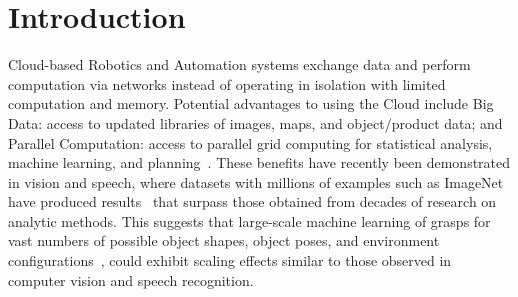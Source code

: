 \section{Introduction}

Cloud-based Robotics and Automation systems exchange data and perform computation via networks instead of operating in isolation with limited computation and memory.
Potential advantages to using the Cloud include Big Data: access to updated libraries of images, maps, and object/product data; and Parallel Computation: access to parallel grid computing for statistical analysis, machine learning, and planning~\cite{kehoe2015survey}.
These benefits have recently been demonstrated in vision and speech, where datasets with millions of examples such as ImageNet have produced results~\cite{hannun2014deepspeech, krizhevsky2012imagenet} that surpass those obtained from decades of research on analytic methods.
This suggests that large-scale machine learning of grasps for vast numbers of possible object shapes, object poses, and environment configurations~\cite{goldfeder2011data, lenz2015deep, kappler2015leveraging}, could exhibit scaling effects similar to those observed in computer vision and speech recognition.

